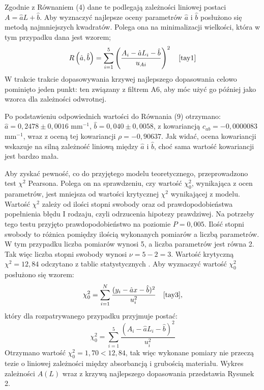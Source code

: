 \documentclass[10pt,a4paper]{article}
\begin{document}
Zgodnie z Równaniem (4) dane te podlegają zależności liniowej postaci $A=\hat{a}L+\hat{b}$. Aby wyznaczyć najlepsze oceny parametrów $\hat{a}$ i $\hat{b}$ posłużono się metodą najmniejszych kwadratów. Polega ona na minimalizacji wielkości, która w tym przypadku dana jest wzorem;
\begin{equation}
R\left(\hat{a}, \hat{b} \right)=\sum_{i=1}^{5}\left(\dfrac{A_{i}-\hat{a}L_{i}-\hat{b}}{u_{Ai}}\right)^2 \quad \cite{tay1}
\end{equation}
W trakcie trakcie dopasowywania krzywej najlepszego dopasowania celowo pominięto jeden punkt: ten związany z filtrem A6, aby móc użyć go później jako wzorca dla zależności odwrotnej. 

Po podstawieniu odpowiednich wartości do Równania (9) otrzymano: $\hat{a}=0,2478\pm0,0016$ mm$^{-1}$, $\hat{b}=0,040\pm0,0058$, z kowariancją $c_{ab}=-0,0000083$ mm$^{-1}$, wraz z oceną tej kowariancji $\rho=-0,90637$. Jak widać, ocena kowariancji wskazuje na silną zależność liniową między $\hat{a}$ i $\hat{b}$, choć sama wartość kowariancji jest bardzo mała. 

Aby zyskać pewność, co do przyjętego modelu teoretycznego, przeprowadzono test $\chi^2$ Pearsona. Polega on na sprawdzeniu, czy wartość $\chi_{0}^2$, wynikająca z ocen parametrów, jest mniejsza od wartości krytycznej $\chi^2$ wynikającej z modelu. Wartość $\chi^2$ zależy od ilości stopni swobody oraz od prawdopodobieństwa popełnienia błędu I rodzaju, czyli odrzucenia hipotezy prawdziwej. Na potrzeby tego testu przyjęto prawdopodobieństwo na poziomie $P=0,005$. Ilość stopni swobody to różnica pomiędzy ilością wykonanych pomiarów a liczbą parametrów. W tym przypadku liczba pomiarów wynosi 5, a liczba parametrów jest równa 2. Tak więc liczba stopni swobody wynosi $\nu=5-2=3$. Wartość krytyczną $\chi^2=12,84$ odczytano z tablic statystycznych \cite{g1}. Aby wyznaczyć wartość $\chi_{0}^2$ posłużono się wzorem:
\begin{equation}
 \chi_{0}^2=\sum_{i=1}^N\dfrac{(y_{i}-\hat{a}x-\hat{b})^2}{u_{i}^2} \quad \cite{tay3},
 \end{equation} 
który dla rozpatrywanego przypadku przyjmuje postać:
\begin{equation}
\label{r17}
 \chi_{0}^2=\sum_{i=1}^5\dfrac{(A_{i}-\hat{a}L_{i}-\hat{b})^2}{u_{i}^2} 
 \end{equation} 
Otrzymano wartość $\chi_{0}^2=1,70<12,84$, tak więc wykonane pomiary nie przeczą tezie o liniowej zależności między absorbancją i grubością materiału. Wykres zależności $A(L)$ wraz z krzywą najlepszego dopasowania przedstawia Rysunek 2.
\end{document}
